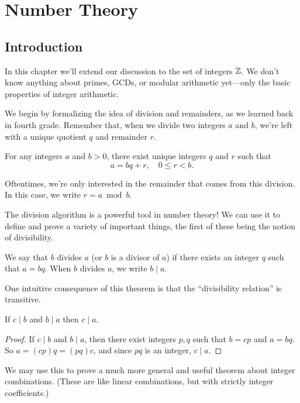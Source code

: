 \documentclass[../m055main.tex]{subfiles}
\begin{document}
\chapter{Number Theory}

\section{Introduction}
In this chapter we'll extend our discussion to the set of integers $\mathbb{Z}$.
We don't know anything about primes, GCDs, or modular arithmetic yet---only the basic properties of integer arithmetic.

We begin by formalizing the idea of division and remainders, as we learned back in fourth grade.
Remember that, when we divide two integers $a$ and $b$, we're left with a unique quotient $q$ and remainder $r$.

\begin{theorem}
    For any integers $a$ and $b > 0$, there exist unique integers $q$ and $r$ such that
    \[ a = bq + r, \quad 0 \leq r < b. \]
\end{theorem}

Oftentimes, we're only interested in the remainder that comes from this division.
In this case, we write $r = a \bmod b$.

The division algorithm is a powerful tool in number theory!
We can use it to define and prove a variety of important things, the first of these being the notion of divisibility.

\begin{definition}[Divisibility]
    We say that $b$ divides $a$ (or $b$ is a divisor of $a$) if there exists an integer $q$ such that $a = bq$.
    When $b$ divides $a$, we write $b \mid a$.
\end{definition}

One intuitive consequence of this theorem is that the ``divisibility relation'' is transitive.

\begin{theorem}
    If $c \mid b$ and $b \mid a$ then $c \mid a$.
\end{theorem}

\begin{proof}
    If $c \mid b$ and $b \mid a$, then there exist integers $p,q$ such that $b = cp$ and $a = bq$.
    So $a = (cp)q = (pq)c$, and since $pq$ is an integer, $c \mid a$.
\end{proof}

We may use this to prove a much more general and useful theorem about integer combinations.
(These are like linear combinations, but with strictly integer coefficients.)
\end{document}
